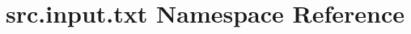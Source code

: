 \hypertarget{namespacesrc_1_1input_1_1txt}{\section{src.\+input.\+txt Namespace Reference}
\label{namespacesrc_1_1input_1_1txt}
}
